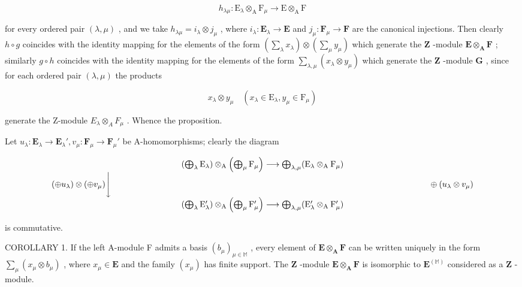 \[
h _ {\lambda \mu}: \mathrm{E} _ {\lambda} \otimes_ {\mathrm{A}} \mathrm{F} _ {\mu} \rightarrow \mathrm{E} \otimes_ {\mathrm{A}} \mathrm{F}
\]

for every ordered pair \((\lambda, \mu)\) , and we take \(h_{\lambda \mu} = i_{\lambda} \otimes j_{\mu}\) , where \(i_{\lambda}: \mathbf{E}_{\lambda} \to \mathbf{E}\) and \(j_{\mu}: \mathbf{F}_{\mu} \to \mathbf{F}\) are the canonical injections. Then clearly \(h \circ g\) coincides with the identity mapping for the elements of the form \(\left(\sum_{\lambda} x_{\lambda}\right) \otimes \left(\sum_{\mu} y_{\mu}\right)\) which generate the \(\mathbf{Z}\) -module \(\mathbf{E} \otimes_{\mathbf{A}} \mathbf{F}\) ; similarly \(g \circ h\) coincides with the identity mapping for the elements of the form \(\sum_{\lambda, \mu} (x_{\lambda} \otimes y_{\mu})\) which generate the \(\mathbf{Z}\) -module \(\mathbf{G}\) , since for each ordered pair \((\lambda, \mu)\) the products

\[
x _ {\lambda} \otimes y _ {\mu} \quad (x _ {\lambda} \in \mathrm{E} _ {\lambda}, y _ {\mu} \in \mathrm{F} _ {\mu})
\]

generate the Z-module \(E_{\lambda} \otimes_{A} F_{\mu}\) . Whence the proposition.

Let \(u_{\lambda}: \mathbf{E}_{\lambda} \to \mathbf{E}_{\lambda}', v_{\mu}: \mathbf{F}_{\mu} \to \mathbf{F}_{\mu}'\) be A-homomorphisms; clearly the diagram

\[
\begin{array}{c} \left(\bigoplus_ {\lambda} \mathrm{E} _ {\lambda}\right) \otimes_ {\mathrm{A}} \left(\bigoplus_ {\mu} \mathrm{F} _ {\mu}\right) \longrightarrow \bigoplus_ {\lambda , \mu} (\mathrm{E} _ {\lambda} \otimes_ {\mathrm{A}} \mathrm{F} _ {\mu}) \\ (\oplus u _ {\lambda}) \otimes (\oplus v _ {\mu}) \Bigg \downarrow \qquad \qquad \qquad \qquad \qquad \qquad \qquad \qquad \qquad \qquad \qquad \qquad \qquad \qquad \qquad \qquad \qquad \qquad \qquad \oplus (u _ {\lambda} \otimes v _ {\mu}) \\ \left(\bigoplus_ {\lambda} \mathrm{E} _ {\lambda} ^ {\prime}\right) \otimes_ {\mathrm{A}} \left(\bigoplus_ {\mu} \mathrm{F} _ {\mu} ^ {\prime}\right) \longrightarrow \bigoplus_ {\lambda , \mu} (\mathrm{E} _ {\lambda} ^ {\prime} \otimes_ {\mathrm{A}} \mathrm{F} _ {\mu} ^ {\prime}) \end{array}
\]

is commutative.

COROLLARY 1. If the left A-module F admits a basis \((b_{\mu})_{\mu \in \mathbb{M}}\) , every element of \(\mathbf{E} \otimes_{\mathbf{A}} \mathbf{F}\) can be written uniquely in the form \(\sum_{\mu} (x_{\mu} \otimes b_{\mu})\) , where \(x_{\mu} \in \mathbf{E}\) and the family \((x_{\mu})\) has finite support. The \(\mathbf{Z}\) -module \(\mathbf{E} \otimes_{\mathbf{A}} \mathbf{F}\) is isomorphic to \(\mathbf{E}^{(\mathbb{M})}\) considered as a \(\mathbf{Z}\) -module.

